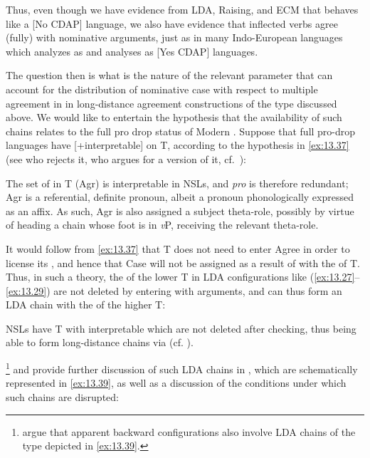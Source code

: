 \documentclass[output=paper]{langsci/langscibook}
\begin{document}
\begin{exe}
Thus, even though we have evidence from \gls{LDA}, Raising, and
\gls{ECM} that  behaves like a [No
\gls{CDAP}] language, we also have evidence that inflected verbs agree (fully)
with nominative arguments, just as in many Indo-European
languages which \citet{Baker2015} analyzes as  and \citet{Baker2008}
analyses as [Yes \gls{CDAP}] languages.

The question then is what is the nature of the relevant parameter that can
account for the distribution of nominative case with respect to multiple
agreement in  in long-distance agreement constructions of the type
discussed above. We would like to entertain the hypothesis that the
availability of such chains relates to the full pro drop status of Modern
. Suppose that full pro-drop languages have [+interpretable]
 on T, according to the hypothesis in \eqref{ex:13.37} (see
\citealt{Holmberg2005} who rejects it, \citealt{Barbosa2009} who argues for a
version of it, cf.\ \citealt{AleAna1998}):

\ea%
    \label{ex:13.37}
    The set of  in T (Agr) is interpretable in \glspl{NSL}, and
    \emph{pro} is therefore redundant; Agr is a referential, definite pronoun,
    albeit a pronoun phonologically expressed as an affix. As such, Agr is also
    assigned a subject theta-role, possibly by virtue of heading a chain whose
    foot is in \emph{v}P,   receiving the relevant theta-role.
\z

It would follow from \eqref{ex:13.37} that T does not need to enter Agree
in order to license its , and hence that \Nom{} Case will not be
assigned as a result of  with the  of T. Thus, in such a
theory, the  of the lower T in \gls{LDA} configurations like
(\ref{ex:13.27}--\ref{ex:13.29}) are not deleted by entering  with
\Nom{} arguments, and can thus form an \gls{LDA} chain with the  of
the higher T:

\ea%
    \label{ex:13.38}
    \glspl{NSL} have T with interpretable  which are not
    deleted after checking, thus being able to form long-distance chains via
     (cf.  \citealt{Ura1994}).
\z

\textcite{TsaAnaAle2017,TsaAleAna2019}\footnote{\citeauthor{TsaAnaAle2017}
argue that apparent backward  configurations also involve \gls{LDA}
chains of the type depicted in \eqref{ex:13.39}.} and \citet{AleAna2019} provide
further discussion of such \gls{LDA} chains in , which are schematically
represented in \eqref{ex:13.39}, as well as a discussion of the conditions under
which such chains are disrupted:


\end{exe}
\end{document}
